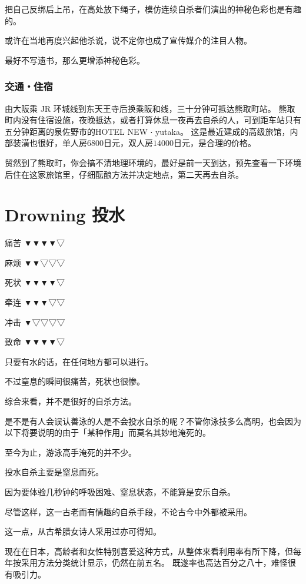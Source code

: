 \documentclass[UTF8]{ctexart}
\begin{document}
把自己反绑后上吊，在高处放下绳子，模仿连续自杀者们演出的神秘色彩也是有趣的。

或许在当地再度兴起他杀说，说不定你也成了宣传媒介的注目人物。

最好不写遗书，那么更增添神秘色彩。

\subsubsection{交通‧住宿}

由大阪乘 JR 环城线到东天王寺后换乘阪和线，三十分钟可抵达熊取町站。
熊取町内没有住宿设施，夜晚抵达，或者打算休息一夜再去自杀的人，可到距车站只有五分钟距离的泉佐野市的HOTEL NEW ‧ yutaka。
这是最近建成的高级旅馆，内部装潢也很好，单人房$6800$日元，双人房$14000$日元，是合理的价格。

贸然到了熊取町，你会搞不清地理环境的，最好是前一天到达，预先查看一下环境后住在这家旅馆里，仔细酝酿方法并决定地点，第二天再去自杀。


\newpage

\section{Drowning 投水}

痛苦 ▼▼▼▼▽

麻烦 ▼▼▽▽▽

死状 ▼▼▼▼▽

牵连 ▼▼▼▽▽

冲击 ▼▽▽▽▽

致命 ▼▼▼▼▽

只要有水的话，在任何地方都可以进行。

不过窒息的瞬间很痛苦，死状也很惨。

综合来看，并不是很好的自杀方法。

是不是有人会误认善泳的人是不会投水自杀的呢？不管你泳技多么高明，也会因为以下将要说明的由于「某种作用」而莫名其妙地淹死的。

至今为止，游泳高手淹死的并不少。

投水自杀主要是窒息而死。

因为要体验几秒钟的呼吸困难、窒息状态，不能算是安乐自杀。

尽管这样，这一古老而有情趣的自杀手段，不论古今中外都被采用。

这一点，从古希腊女诗人采用过亦可得知。

现在在日本，高龄者和女性特别喜爱这种方式，从整体来看利用率有所下降，但每年按采用方法分类统计显示，仍然在前五名。
既遂率也高达百分之八十，难怪很 有吸引力。 
\end{document}
